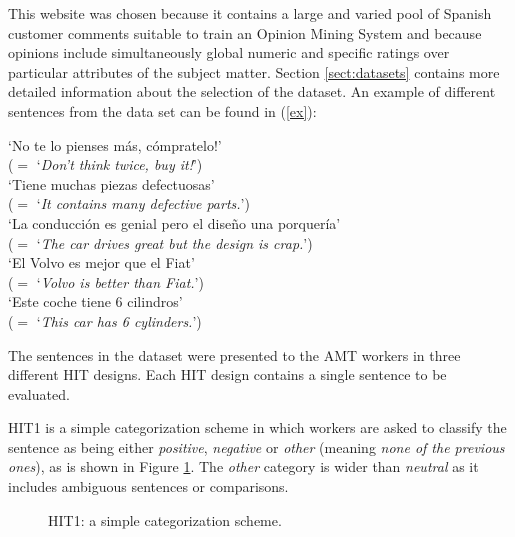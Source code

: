 \documentclass[11pt]{elsarticle}
\begin{document}
This website was chosen because it contains a large and varied pool of Spanish customer comments suitable to train an Opinion Mining System and because opinions include simultaneously global numeric and specific ratings over particular attributes of the subject matter. Section \ref{sect:datasets} contains more detailed information about the selection of the dataset. An example of different sentences from the data set can be found in (\ref{ex}):

\begin{li}
  \label{ex}
  `No te lo pienses m\'{a}s, c\'{o}mpratelo!'\\
  ($=$ `\textit{Don't think twice, buy it!}')\\
   `Tiene muchas piezas defectuosas'\\
  ($=$ `\textit{It contains many defective parts.}')\\
   `La conducci\'on es genial pero el dise\~no una porquer\'ia'\\
  ($=$ `\textit{The car drives great but the design is crap.}')\\
   `El Volvo es mejor que el Fiat'\\
  ($=$ `\textit{Volvo is better than Fiat.}')\\
 `Este coche tiene 6 cilindros'\\
  ($=$ `\textit{This car has 6 cylinders.}')\\
\end{li}


The sentences in the dataset were presented to the AMT workers in three different HIT designs. Each HIT design contains a single sentence to be evaluated.

HIT1 is a simple categorization scheme in which workers are asked to classify the sentence as being either \textit{positive}, \textit{negative} or \textit{other} (meaning \textit{none of the previous ones}), as is shown in Figure \ref{hit1}. The \textit{other} category is wider than
\textit{neutral} as it includes ambiguous sentences or comparisons.


\begin{figure}[ht]
  \begin{center}
\caption{HIT1: a simple categorization scheme.}
\label{hit1}
  \end{center}
\end{figure}
\end{document}
